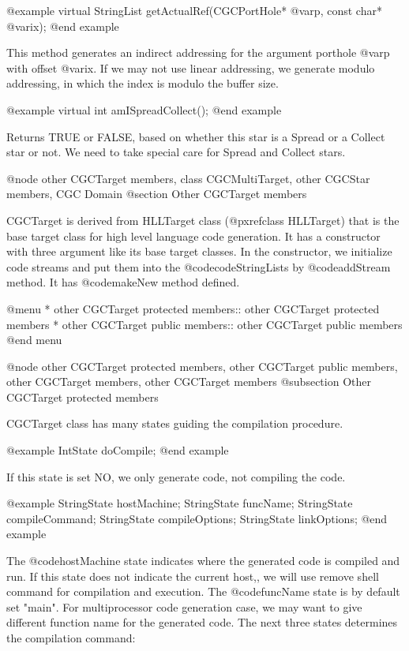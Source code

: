 {@example
virtual StringList getActualRef(CGCPortHole* @var{p}, const char* @var{ix});
@end example

This method generates an indirect addressing for the argument porthole @var{p}
with offset @var{ix}. If we may not use linear addressing, we generate
modulo addressing, in which the index is modulo the buffer size.

@example
virtual int amISpreadCollect();
@end example

Returns TRUE or FALSE, based on whether this star is a Spread or a Collect
star or not. We need to take special care for Spread and Collect stars.

@node other CGCTarget members, class CGCMultiTarget, other CGCStar members, CGC Domain
@section Other CGCTarget members

CGCTarget is derived from HLLTarget class (@pxref{class HLLTarget})
that is the base target class for high level language code generation. 
It has a constructor with three argument like its base target classes.
In the constructor, we initialize code streams and put them into the
@code{codeStringLists} by @code{addStream} method.
It has @code{makeNew} method defined.

@menu
* other CGCTarget protected members::	other CGCTarget protected members
* other CGCTarget public members::	other CGCTarget public members
@end menu

@node other CGCTarget protected members, other CGCTarget public members, other CGCTarget members, other CGCTarget members
@subsection Other CGCTarget protected members

CGCTarget class has many states guiding the compilation procedure.

@example
IntState doCompile;
@end example

If this state is set NO, we only generate code, not compiling the code.

@example
StringState hostMachine;
StringState funcName;
StringState compileCommand;
StringState compileOptions;
StringState linkOptions;
@end example

The @code{hostMachine} state indicates where the generated code is compiled
and run. If this state does not indicate the current host,, we will use
remove shell command for compilation and execution. The @code{funcName}
state is by default set "main". For multiprocessor code generation case,
we may want to give different function name for the generated code.
The next three states determines the compilation command:

}
